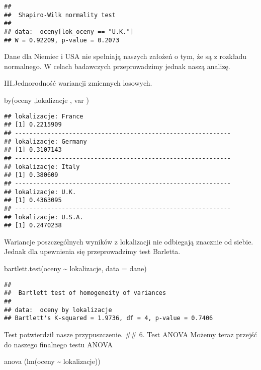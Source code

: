 \documentclass[
]{article}
\newenvironment{Shaded}{\begin{snugshade}}{\end{snugshade}}
\newcommand{\AttributeTok}[1]{\textcolor[rgb]{0.77,0.63,0.00}{#1}}
\newcommand{\FunctionTok}[1]{\textcolor[rgb]{0.00,0.00,0.00}{#1}}
\newcommand{\NormalTok}[1]{#1}
\newcommand{\SpecialCharTok}[1]{\textcolor[rgb]{0.00,0.00,0.00}{#1}}
\begin{document}
\begin{verbatim}
## 
##  Shapiro-Wilk normality test
## 
## data:  oceny[lok_oceny == "U.K."]
## W = 0.92209, p-value = 0.2073
\end{verbatim}

Dane dla Niemiec i USA nie spełniają naszych założeń o tym, że są z
rozkładu normalnego. W celach badawczych przeprowadzimy jednak naszą
analizę.

III.Jednorodność wariancji zmiennych losowych.

\begin{Shaded}
\begin{Highlighting}[]
\FunctionTok{by}\NormalTok{(oceny ,lokalizacje , var )}
\end{Highlighting}
\end{Shaded}

\begin{verbatim}
## lokalizacje: France
## [1] 0.2215909
## ------------------------------------------------------------ 
## lokalizacje: Germany
## [1] 0.3107143
## ------------------------------------------------------------ 
## lokalizacje: Italy
## [1] 0.380609
## ------------------------------------------------------------ 
## lokalizacje: U.K.
## [1] 0.4363095
## ------------------------------------------------------------ 
## lokalizacje: U.S.A.
## [1] 0.2470238
\end{verbatim}

Wariancje poszczególnych wyników z lokalizacji nie odbiegają znacznie od
siebie. Jednak dla upewnienia się przeprowadzimy test Barletta.

\begin{Shaded}
\begin{Highlighting}[]
\FunctionTok{bartlett.test}\NormalTok{(oceny }\SpecialCharTok{\textasciitilde{}}\NormalTok{ lokalizacje, }\AttributeTok{data =}\NormalTok{ dane)}
\end{Highlighting}
\end{Shaded}

\begin{verbatim}
## 
##  Bartlett test of homogeneity of variances
## 
## data:  oceny by lokalizacje
## Bartlett's K-squared = 1.9736, df = 4, p-value = 0.7406
\end{verbatim}

Test potwierdził nasze przypuszczenie. \#\# 6. Test ANOVA Możemy teraz
przejść do naszego finalnego testu ANOVA

\begin{Shaded}
\begin{Highlighting}[]
\FunctionTok{anova}\NormalTok{ (}\FunctionTok{lm}\NormalTok{(oceny }\SpecialCharTok{\textasciitilde{}}\NormalTok{ lokalizacje))}
\end{Highlighting}
\end{Shaded}
\end{document}
